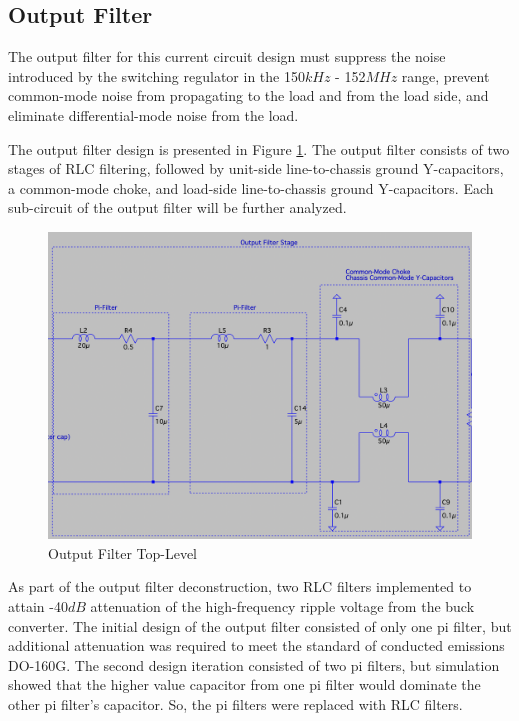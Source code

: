 \documentclass[conference]{IEEEtran}
\begin{document}
\subsection{Output Filter}
The output filter for this current circuit design must suppress the noise introduced by the switching regulator in the 150${kHz}$ - 152${MHz}$ range, prevent common-mode noise from propagating to the load and from the load side, and eliminate differential-mode noise from the load. 

The output filter design is presented in Figure \ref{fig:output_filter_top_level_diagram}. The output filter consists of two stages of RLC filtering, followed by unit-side line-to-chassis ground Y-capacitors, a common-mode choke, and load-side line-to-chassis ground Y-capacitors. Each sub-circuit of the output filter will be further analyzed.

\begin{figure}[htp]
    \centering
    \includegraphics[width=1.0\linewidth]{output_filter_top_level.png}
    \caption{Output Filter Top-Level}
    \label{fig:output_filter_top_level_diagram}
\end{figure}

As part of the output filter deconstruction, two RLC filters implemented to attain -40${dB}$ attenuation of the high-frequency ripple voltage from the buck converter. The initial design of the output filter consisted of only one pi filter, but additional attenuation was required to meet the standard of conducted emissions DO-160G. The second design iteration consisted of two pi filters, but simulation showed that the higher value capacitor from one pi filter would dominate the other pi filter's capacitor. So, the pi filters were replaced with RLC filters.
\end{document}
